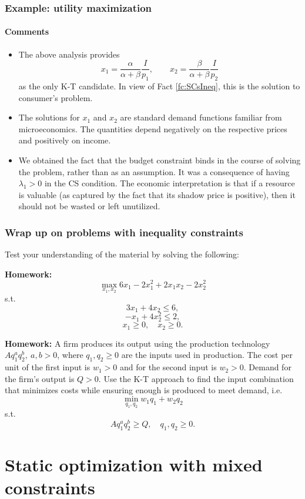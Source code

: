\documentclass[10pt]{beamer}
\theoremstyle{definition}
\begin{document}
\begin{frame}[fragile]
\frametitle{Example: utility maximization}
\framesubtitle{Comments}
\begin{itemize}
\item The above analysis provides \[ x_1 = \dfrac{\alpha}{\alpha+\beta}\dfrac{I}{p_1}, \qquad x_2 = \dfrac{\beta}{\alpha+\beta}\dfrac{I}{p_2} \] as the only K-T candidate. In view of Fact \ref{fc:SCsIneq}, this is the solution to consumer's problem.
\item The solutions for $ x_1 $ and $ x_2 $ are standard demand functions familiar from microeconomics. The quantities depend negatively on the respective prices and positively on income.
\item We obtained the fact that the budget constraint binds in the course of solving the problem, rather than as an assumption. It was a consequence of having $ \lambda_1 > 0$ in the CS condition. The economic interpretation is that if a resource is valuable (as captured by the fact that its shadow price is positive), then it should not be wasted or left unutilized.
\end{itemize}
\end{frame}

\begin{frame}[fragile]
\frametitle{Wrap up on problems with inequality constraints}
Test your understanding of the material by solving the following:

\textbf{Homework:} \[ \max_{x_1,x_2} 6x_1-2 x_1^2 + 2 x_1 x_2-2x_2^2  \]
s.t. 
\[ 3x_1+4x_2 \leq 6, \] 
\[ -x_1 + 4x_2^2 \leq 2, \]
\[  x_1\geq 0,\quad x_2\geq 0. \]

\textbf{Homework:} A firm produces its output using the production technology $ A q_1^a q_2^b,~a,b>0 $, where $ q_1,q_2 \geq 0 $ are the inputs used in production. The cost per unit of the first input is $ w_1 >0 $ and for the second input is $ w_2 >0$. Demand for the firm's output is $ Q>0 $. Use the K-T approach to find the input combination that minimizes costs while ensuring enough is produced to meet demand, i.e. \[ \min_{q_1,q_2} w_1 q_1 + w_2 q_2\]
s.t. \[ A q_1^a q_2^b \geq Q,\quad q_1,q_2 \geq 0. \]
\end{frame}

\section{Static optimization with mixed constraints}\label{sec:mixed}
\end{document}
